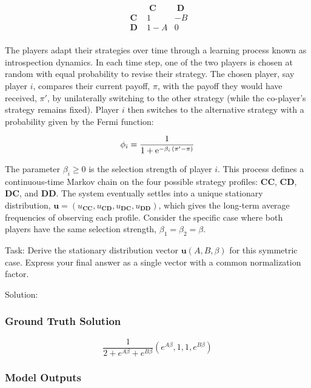 \documentclass[10pt]{article}
\begin{document}
\begin{equation*}
\begin{array}{c|cc}
&\mathbf{\;C\;} &\mathbf{\;D\;}\\
\hline
\mathbf{\;C\;} &1 &-B \\
\mathbf{\;D\;} &1-A &0 \\
\end{array}
\end{equation*}

The players adapt their strategies over time through a learning process known as introspection dynamics. In each time step, one of the two players is chosen at random with equal probability to revise their strategy. The chosen player, say player $i$, compares their current payoff, $\pi$, with the payoff they would have received, $\pi'$, by unilaterally switching to the other strategy (while the co-player's strategy remains fixed). Player $i$ then switches to the alternative strategy with a probability given by the Fermi function:

\begin{equation*}
\phi_i = \frac{1}{1+{\rm e}^{-\beta_i\, (\pi' - \pi)}}
\end{equation*}

The parameter $\beta_i \ge 0$ is the selection strength of player $i$. This process defines a continuous-time Markov chain on the four possible strategy profiles: $\mathbf{CC}$, $\mathbf{CD}$, $\mathbf{DC}$, and $\mathbf{DD}$. The system eventually settles into a unique stationary distribution, $\mathbf{u} = (u_{\mathbf{CC}}, u_{\mathbf{CD}}, u_{\mathbf{DC}}, u_{\mathbf{DD}})$, which gives the long-term average frequencies of observing each profile. Consider the specific case where both players have the same selection strength, $\beta_1 = \beta_2 = \beta$.

Task:
Derive the stationary distribution vector $\mathbf{u}(A, B, \beta)$ for this symmetric case. Express your final answer as a single vector with a common normalization factor.

Solution:

\subsubsection*{Ground Truth Solution}
\[ \boxed{\frac{1}{2 + e^{A \beta} + e^{B \beta}}(e^{A \beta},1,1,e^{B \beta})} \]

\subsubsection*{Model Outputs}
\end{document}
